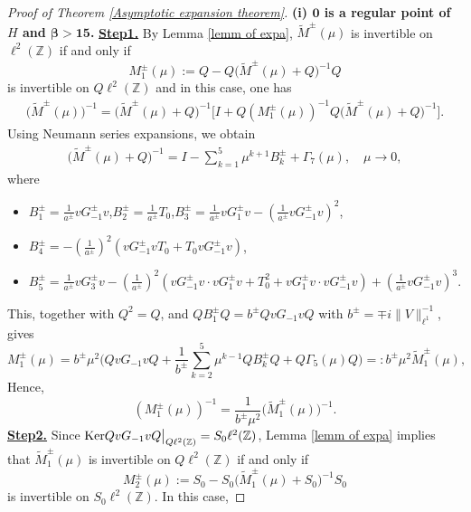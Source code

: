 \documentclass[reqno, 11pt]{amsart}
\newcommand\Z{\mathbb{Z}}
\numberwithin{equation}{section}
\begin{document}
\begin{proof}[Proof of Theorem {\rm\ref{Asymptotic expansion theorem}}]{\bf{(i) ${\bm{0}}$ is a regular point of $H$ and {$\bm{\beta>15}$}.}}
{\bf{\underline{Step1.}}} By Lemma \ref{lemm of expa}, $\widetilde{M}^{\pm}(\mu)$ is invertible on $\ell^{2}(\Z)$ if and only if $$ M^{\pm}_1(\mu):=Q-Q\big(\widetilde{M}^{\pm}(\mu)+Q\big)^{-1}Q$$ is invertible on $Q\ell^{2}(\Z)$ and in this case, one has
\begin{align}\label{Relat of M tuta and M1}
\big(\widetilde{M}^{\pm}(\mu)\big)^{-1}=\big(\widetilde{M}^{\pm}(\mu)+Q\big)^{-1}\Big[I+Q\left(M^{\pm}_1(\mu)\right)^{-1}Q\big(\widetilde{M}^{\pm}(\mu)+Q\big)^{-1}\Big].
\end{align}
Using Neumann series expansions, we obtain 
\begin{align}\label{expr of Bkpm}
\big(\widetilde{M}^{\pm}(\mu)+Q\big)^{-1}=I-\sum\limits_{k=1}^{5}\mu^{k+1}B^{\pm}_{k}+\Gamma_7(\mu),\quad \mu\rightarrow0,
\end{align}
where
\begin{itemize}
\item $B^{\pm}_{1}=\frac{1}{a^{\pm}}vG^{\pm}_{-1}v$,\quad$B^{\pm}_{2}=\frac{1}{a^{\pm}}T_0$,\quad $B^{\pm}_{3}=\frac{1}{a^{\pm}}vG^{\pm}_{1}v-\left(\frac{1}{a^{\pm}}vG^{\pm}_{-1}v\right)^2$,
\vskip0.2cm
\item $B^{\pm}_{4}=-\left(\frac{1}{a^{\pm}}\right)^2\left(vG^{\pm}_{-1}vT_0+T_0vG^{\pm}_{-1}v\right)$,
\item
$B^{\pm}_{5}=\frac{1}{a^{\pm}}vG^{\pm}_{3}v-\left(\frac{1}{a^{\pm}}\right)^2\left(vG^{\pm}_{-1}v\cdot vG^{\pm}_{1}v+T^2_0+vG^{\pm}_{1}v \cdot vG^{\pm}_{-1}v\right)+\left(\frac{1}{a^{\pm}}vG^{\pm}_{-1}v\right)^3$.
\end{itemize}
This, together with $Q^2=Q$, and $QB^{\pm}_1Q=b^{\pm}QvG_{-1}vQ$ with $b^{\pm}=\mp i\|V\|^{-1}_{\ell^1}$, gives
\begin{equation*}
M^{\pm}_1(\mu)=b^{\pm}\mu^2\Big(QvG_{-1}vQ+\frac{1}{b^{\pm}}\sum\limits_{k=2}^{5}\mu^{k-1}QB^{\pm}_{k}Q+Q\Gamma_5(\mu)Q\Big)=:b^{\pm}\mu^2\widetilde{M}^{\pm}_1(\mu),
\end{equation*}
Hence,
\begin{equation}\label{Relat of M1 and M1 tuta}
\left(M^{\pm}_1(\mu)\right)^{-1}=\frac{1}{b^{\pm}\mu^2}\big(\widetilde{M}_{1}^{\pm}(\mu)\big)^{-1}.
\end{equation}
\vskip0.15cm
{\bf{\underline{Step2.}}} Since ${\rm Ker}QvG_{-1}vQ\big|_{Q\ell^2(\Z)}=S_0\ell^{2}(\Z)$, Lemma \ref{lemm of expa} implies that $\widetilde{M}_{1}^{\pm}(\mu)$ is invertible on $Q\ell^{2}(\Z)$ if and only if $$M^{\pm}_{2}(\mu):=S_0-S_0\big(\widetilde{M}_{1}^{\pm}(\mu)+S_0\big)^{-1}S_0$$ is invertible on $S_0\ell^{2}(\Z)$. In this case,

\end{proof}
\end{document}
